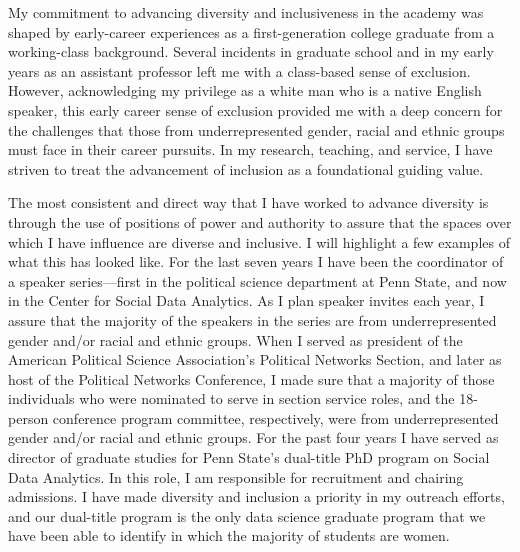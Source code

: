 \documentclass[a4paper, 12pt]{article}
\begin{document}
 
\pagestyle{fancy}

\vspace*{-.8cm}

My commitment to advancing diversity and inclusiveness in the academy was shaped by early-career experiences as a first-generation college graduate from a working-class background. Several incidents in graduate school and in my early years as an assistant professor left me with a class-based sense of exclusion. However, acknowledging my privilege as a white man who is a native English speaker, this early career sense of exclusion provided me with a deep concern for the challenges that those from underrepresented gender, racial and ethnic groups must face in their career pursuits. In my research, teaching, and service, I have striven to treat the advancement of inclusion as a foundational guiding value.

The most consistent and direct way that I have worked to advance diversity is through the use of positions of power and authority to assure that the spaces over which I have influence are diverse and inclusive. I will highlight a few examples of what this has looked like. For the last seven years I have been the coordinator of a speaker series---first in the political science department at Penn State, and now in the Center for Social Data Analytics. As I plan speaker invites each year, I assure that the majority of the speakers in the series are from underrepresented gender and/or racial and ethnic groups. When I served as president of the American Political Science Association's Political Networks Section, and later as host of the Political Networks Conference, I made sure that a majority of those individuals who were nominated to serve in section service roles, and the 18-person conference program committee, respectively, were from underrepresented gender and/or racial and ethnic groups. For the past four years I have served as director of graduate studies for Penn State's dual-title PhD program on Social Data Analytics. In this role, I am responsible for recruitment and chairing admissions. I have made diversity and inclusion a priority in my outreach efforts, and our dual-title program is the only data science graduate program that we have been able to identify in which the majority of students are women. 
\end{document}
